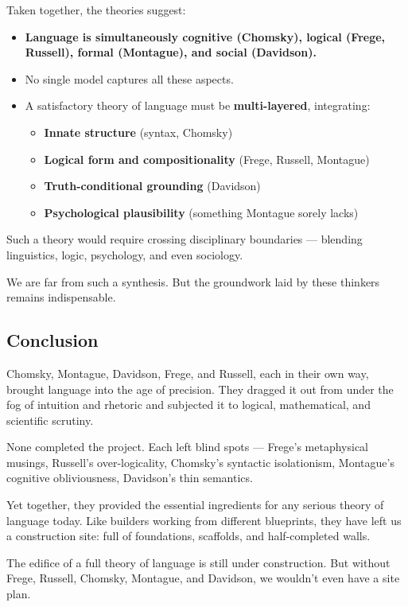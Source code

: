 \documentclass[12pt]{article}
\newcommand{\tightlist}{\itemsep 0pt\parskip 0pt\parsep 0pt}
\begin{document}
Taken together, the theories suggest:

\begin{itemize}
\tightlist
\item
  \textbf{Language is simultaneously cognitive (Chomsky), logical
  (Frege, Russell), formal (Montague), and social (Davidson).}
\item
  No single model captures all these aspects.
\item
  A satisfactory theory of language must be \textbf{multi-layered},
  integrating:

  \begin{itemize}
  \tightlist
  \item
    \textbf{Innate structure} (syntax, Chomsky)
  \item
    \textbf{Logical form and compositionality} (Frege, Russell,
    Montague)
  \item
    \textbf{Truth-conditional grounding} (Davidson)
  \item
    \textbf{Psychological plausibility} (something Montague sorely
    lacks)
  \end{itemize}
\end{itemize}

Such a theory would require crossing disciplinary boundaries ---
blending linguistics, logic, psychology, and even sociology.

We are far from such a synthesis. But the groundwork laid by these
thinkers remains indispensable.

\hypertarget{conclusion-5}{%
\subsection{Conclusion}\label{conclusion-5}}

Chomsky, Montague, Davidson, Frege, and Russell, each in their own way,
brought language into the age of precision. They dragged it out from
under the fog of intuition and rhetoric and subjected it to logical,
mathematical, and scientific scrutiny.

None completed the project. Each left blind spots --- Frege's
metaphysical musings, Russell's over-logicality, Chomsky's syntactic
isolationism, Montague's cognitive obliviousness, Davidson's thin
semantics.

Yet together, they provided the essential ingredients for any serious
theory of language today. Like builders working from different
blueprints, they have left us a construction site: full of foundations,
scaffolds, and half-completed walls.

The edifice of a full theory of language is still under construction.
But without Frege, Russell, Chomsky, Montague, and Davidson, we wouldn't
even have a site plan.
\end{document}
